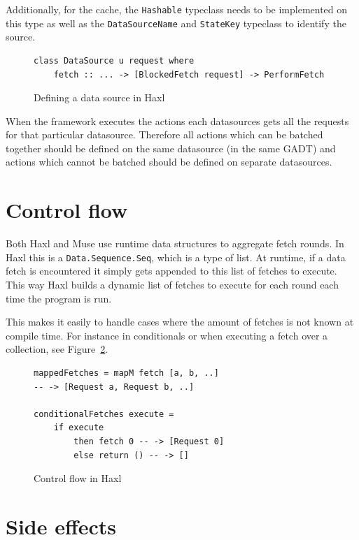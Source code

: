 Additionally, for the cache, the \texttt{Hashable} typeclass needs to be implemented on this type as well as the \texttt{DataSourceName} and \texttt{StateKey} typeclass to identify the source.

\begin{figure}
\begin{verbatim}
class DataSource u request where
    fetch :: ... -> [BlockedFetch request] -> PerformFetch
\end{verbatim}
\caption{Defining a data source in Haxl}
\label{fig:defining-datsource-in-haxl}
\end{figure}

When the framework executes the actions each datasources gets all the requests for that particular datasource. Therefore all actions which can be batched together should be defined on the same datasource (in the same GADT) and actions which cannot be batched should be defined on separate datasources.

\section{Control flow}

Both Haxl and Muse use runtime data structures to aggregate fetch rounds.
In Haxl this is a \texttt{Data.Sequence.Seq}, which is a type of list.
At runtime, if a data fetch is encountered it simply gets appended to this list of fetches to execute.
This way Haxl builds a dynamic list of fetches to execute for each round each time the program is run.

This makes it easily to handle cases where the amount of fetches is not known at compile time.
For instance in conditionals or when executing a fetch over a collection, see Figure~\ref{fig:control-flow-in-haxl}.

\begin{figure}
\begin{verbatim}
mappedFetches = mapM fetch [a, b, ..]
-- -> [Request a, Request b, ..]

conditionalFetches execute =
    if execute
        then fetch 0 -- -> [Request 0]
        else return () -- -> []
\end{verbatim}
\caption{Control flow in Haxl}
\label{fig:control-flow-in-haxl}
\end{figure}

\section{Side effects}

